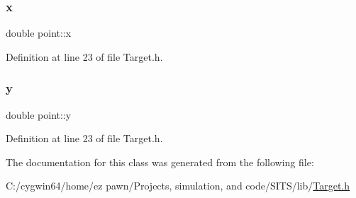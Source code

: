 \subsubsection{\texorpdfstring{x}{x}}
{\footnotesize\ttfamily double point\+::x}



Definition at line 23 of file Target.\+h.

\mbox{\label{classpoint_a613f8f0d7352731638b0094e1b958b87}} 
\subsubsection{\texorpdfstring{y}{y}}
{\footnotesize\ttfamily double point\+::y}



Definition at line 23 of file Target.\+h.



The documentation for this class was generated from the following file\+:\begin{DoxyCompactItemize}
\item 
C\+:/cygwin64/home/ez pawn/\+Projects, simulation, and code/\+S\+I\+T\+S/lib/\hyperlink{_target_8h}{Target.\+h}\end{DoxyCompactItemize}
